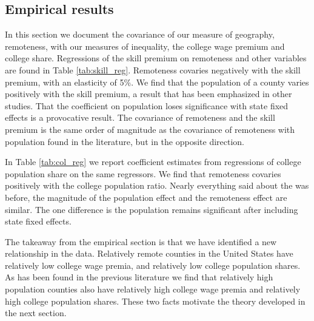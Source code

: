 \documentclass[12 pt]{article}
\begin{document}
\subsection{Empirical results}
In this section we document the covariance of our measure of geography, remoteness, with our measures of inequality, the college wage premium and college share.  Regressions of the skill premium on remoteness and other variables are found in Table \ref{tab:skill_reg}.  Remoteness covaries negatively with the skill premium, with an elasticity of 5\%.  We find that the population of a county varies positively with the skill premium, a result that has been emphasized in other studies.  That the coefficient on population loses significance with state fixed effects is a provocative result.  The covariance of remoteness and the skill premium is the same order of magnitude as the covariance of remoteness with population found in the literature, but in the opposite direction.

In Table \ref{tab:col_reg} we report coefficient estimates from regressions of college population share on the same regressors.  We find that remoteness covaries positively with the college population ratio.  Nearly everything said about the was before, the magnitude of the population effect and the remoteness effect are similar.  The one difference is the population remains significant after including state fixed effects.

The takeaway from the empirical section is that we have identified a new relationship in the data.  Relatively remote counties in the United States have relatively low college wage premia, and relatively low college population shares.  As has been found in the previous literature we find that relatively high population counties also have relatively high college wage premia and relatively high college population shares.  These two facts motivate the theory developed in the next section.
\end{document}
